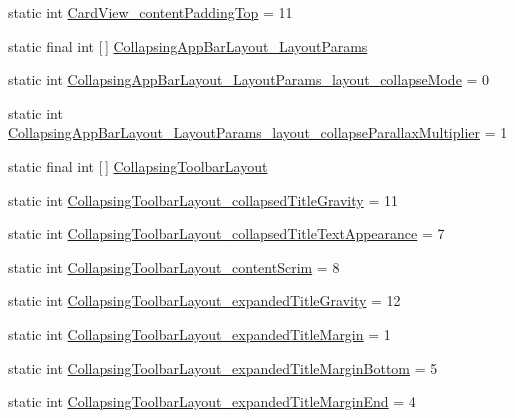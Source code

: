 \begin{DoxyCompactItemize}
\item 
static int \hyperlink{classandroid_1_1support_1_1v4_1_1R_1_1styleable_a3fba8ccb4f7b564c68196944c1b7f422}{Card\+View\+\_\+content\+Padding\+Top} = 11
\item 
static final int \mbox{[}$\,$\mbox{]} \hyperlink{classandroid_1_1support_1_1v4_1_1R_1_1styleable_a0696d62845b5e876d66afb6909f133af}{Collapsing\+App\+Bar\+Layout\+\_\+\+Layout\+Params}
\item 
static int \hyperlink{classandroid_1_1support_1_1v4_1_1R_1_1styleable_a6634b3cf2029d73a6896c60088d6e7db}{Collapsing\+App\+Bar\+Layout\+\_\+\+Layout\+Params\+\_\+layout\+\_\+collapse\+Mode} = 0
\item 
static int \hyperlink{classandroid_1_1support_1_1v4_1_1R_1_1styleable_afdc4be27d8e580fe8002a2351e0ed781}{Collapsing\+App\+Bar\+Layout\+\_\+\+Layout\+Params\+\_\+layout\+\_\+collapse\+Parallax\+Multiplier} = 1
\item 
static final int \mbox{[}$\,$\mbox{]} \hyperlink{classandroid_1_1support_1_1v4_1_1R_1_1styleable_a91b20e27088c910353d38c1efde32aa9}{Collapsing\+Toolbar\+Layout}
\item 
static int \hyperlink{classandroid_1_1support_1_1v4_1_1R_1_1styleable_a116fc8e3a3a97d7ee07ca793adfc6443}{Collapsing\+Toolbar\+Layout\+\_\+collapsed\+Title\+Gravity} = 11
\item 
static int \hyperlink{classandroid_1_1support_1_1v4_1_1R_1_1styleable_a297bf6b40c1f2eee45e130be12d85e50}{Collapsing\+Toolbar\+Layout\+\_\+collapsed\+Title\+Text\+Appearance} = 7
\item 
static int \hyperlink{classandroid_1_1support_1_1v4_1_1R_1_1styleable_aee1e1a60d8efff968f52ae63c1b6859c}{Collapsing\+Toolbar\+Layout\+\_\+content\+Scrim} = 8
\item 
static int \hyperlink{classandroid_1_1support_1_1v4_1_1R_1_1styleable_aa59a6ab621e7092c65425b2e443edc19}{Collapsing\+Toolbar\+Layout\+\_\+expanded\+Title\+Gravity} = 12
\item 
static int \hyperlink{classandroid_1_1support_1_1v4_1_1R_1_1styleable_a6fd0a1e2b2413e90f19c65f14b587b87}{Collapsing\+Toolbar\+Layout\+\_\+expanded\+Title\+Margin} = 1
\item 
static int \hyperlink{classandroid_1_1support_1_1v4_1_1R_1_1styleable_af294e92101d0832bed66945ee1c5f89b}{Collapsing\+Toolbar\+Layout\+\_\+expanded\+Title\+Margin\+Bottom} = 5
\item 
static int \hyperlink{classandroid_1_1support_1_1v4_1_1R_1_1styleable_ad97c2223a320934180256ace4b0d2a40}{Collapsing\+Toolbar\+Layout\+\_\+expanded\+Title\+Margin\+End} = 4

\end{DoxyCompactItemize}

